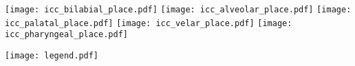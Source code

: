 \documentclass[varwidth=7in]{standalone}
\begin{document}
\raggedright

\texttt{[image: icc\_bilabial\_place.pdf]}%
\texttt{[image: icc\_alveolar\_place.pdf]}%
\texttt{[image: icc\_palatal\_place.pdf]}%
\texttt{[image: icc\_velar\_place.pdf]}%
\texttt{[image: icc\_pharyngeal\_place.pdf]}

\texttt{[image: legend.pdf]}
\end{document}
